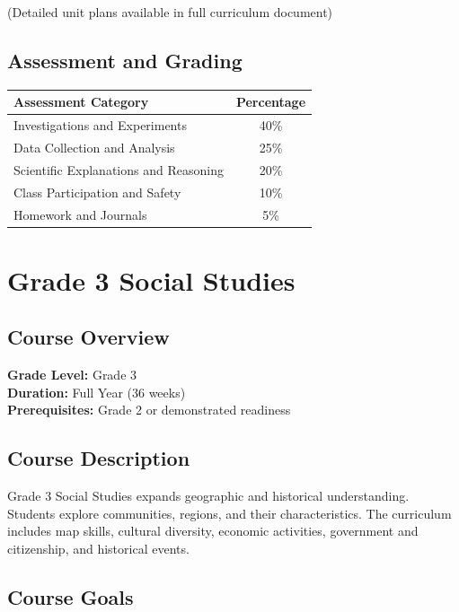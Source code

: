 \documentclass[11pt,letterpaper]{report}
\begin{document}
(Detailed unit plans available in full curriculum document)

\section{Assessment and Grading}

\begin{center}
\begin{tabular}{|l|c|}
\hline
\textbf{Assessment Category} & \textbf{Percentage} \\
\hline
Investigations and Experiments & 40\% \\
\hline
Data Collection and Analysis & 25\% \\
\hline
Scientific Explanations and Reasoning & 20\% \\
\hline
Class Participation and Safety & 10\% \\
\hline
Homework and Journals & 5\% \\
\hline
\end{tabular}
\end{center}

\chapter{Grade 3 Social Studies}

\section{Course Overview}

\textbf{Grade Level:} Grade 3\\
\textbf{Duration:} Full Year (36 weeks)\\
\textbf{Prerequisites:} Grade 2 or demonstrated readiness

\section{Course Description}

Grade 3 Social Studies expands geographic and historical understanding. Students explore communities, regions, and their characteristics. The curriculum includes map skills, cultural diversity, economic activities, government and citizenship, and historical events.

\section{Course Goals}
\end{document}
